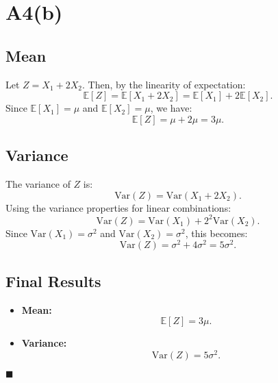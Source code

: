 \documentclass{article}
\begin{document}
\section*{A4(b)}

\subsection*{Mean}
Let \( Z = X_1 + 2X_2 \). Then, by the linearity of expectation:
\[
\mathbb{E}[Z] = \mathbb{E}[X_1 + 2X_2] = \mathbb{E}[X_1] + 2\mathbb{E}[X_2].
\]
Since \( \mathbb{E}[X_1] = \mu \) and \( \mathbb{E}[X_2] = \mu \), we have:
\[
\mathbb{E}[Z] = \mu + 2\mu = 3\mu.
\]

\subsection*{Variance}
The variance of \( Z \) is:
\[
\text{Var}(Z) = \text{Var}(X_1 + 2X_2).
\]
Using the variance properties for linear combinations:
\[
\text{Var}(Z) = \text{Var}(X_1) + 2^2 \text{Var}(X_2).
\]
Since \( \text{Var}(X_1) = \sigma^2 \) and \( \text{Var}(X_2) = \sigma^2 \), this becomes:
\[
\text{Var}(Z) = \sigma^2 + 4\sigma^2 = 5\sigma^2.
\]

\subsection*{Final Results}
\begin{itemize}
    \item \textbf{Mean:}
    \[
    \mathbb{E}[Z] = 3\mu.
    \]
    \item \textbf{Variance:}
    \[
    \text{Var}(Z) = 5\sigma^2.
    \]
\end{itemize}

\hfill\(\blacksquare\)
\end{document}
